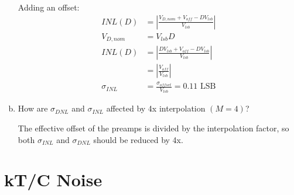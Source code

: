 \documentclass[11pt]{article}
\begin{document}
\begin{enumerate}[a)]
    Adding an offset:
    \begin{align*}
      INL(D) &= \left| \frac{V_{D,nom} + V_{off} - D V_{lsb}}{V_{lsb}} \right| \\
      V_{D,nom} &= V_{lsb} D \\
      INL(D) &= \left| \frac{D V_{lsb} + V_{off} - D V_{lsb}}{V_{lsb}} \right| \\
      &= \left| \frac{V_{off}}{V_{lsb}} \right| \\
      \sigma_{INL} &= \frac{\sigma_{offset}}{V_{lsb}} = 0.11 \text{ LSB}
    \end{align*}

  \item How are $\sigma_{DNL}$ and $\sigma_{INL}$ affected by 4x interpolation $(M = 4)$?

    The effective offset of the preamps is divided by the interpolation factor, so both $\sigma_{INL}$ and $\sigma_{DNL}$ should be reduced by 4x.
\end{enumerate}

\section*{kT/C Noise}
\end{document}
